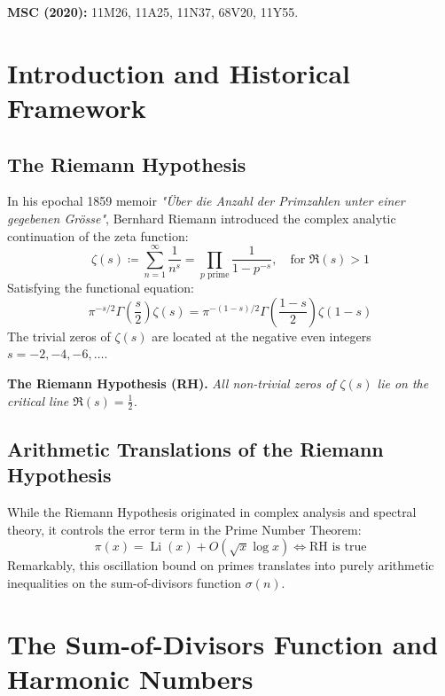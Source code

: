 \documentclass[11pt,a4paper]{article}
\theoremstyle{definition}
\begin{document}
\noindent\textbf{MSC (2020):} 11M26, 11A25, 11N37, 68V20, 11Y55.

\tableofcontents
\newpage

\section{Introduction and Historical Framework}

\subsection{The Riemann Hypothesis}
In his epochal 1859 memoir \emph{"Über die Anzahl der Primzahlen unter einer gegebenen Grösse"}, Bernhard Riemann \cite{riemann1859} introduced the complex analytic continuation of the zeta function:
\begin{equation}\label{eq:zeta_def}
\zeta(s) \coloneqq \sum_{n=1}^\infty \frac{1}{n^s} = \prod_{p \text{ prime}} \frac{1}{1 - p^{-s}}, \quad \text{for } \Re(s) > 1
\end{equation}
Satisfying the functional equation:
\begin{equation}\label{eq:functional}
\pi^{-s/2} \Gamma\left(\frac{s}{2}\right) \zeta(s) = \pi^{-(1-s)/2} \Gamma\left(\frac{1-s}{2}\right) \zeta(1-s)
\end{equation}
The trivial zeros of $\zeta(s)$ are located at the negative even integers $s = -2, -4, -6, \dots$.

\noindent\textbf{The Riemann Hypothesis (RH).} \textit{All non-trivial zeros of $\zeta(s)$ lie on the critical line $\Re(s) = \frac{1}{2}$.}

\subsection{Arithmetic Translations of the Riemann Hypothesis}
While the Riemann Hypothesis originated in complex analysis and spectral theory, it controls the error term in the Prime Number Theorem:
\begin{equation}\label{eq:pnt_error}
\pi(x) = \operatorname{Li}(x) + O\left(\sqrt{x} \log x\right) \iff \text{RH is true}
\end{equation}
Remarkably, this oscillation bound on primes translates into purely arithmetic inequalities on the sum-of-divisors function $\sigma(n)$.

\section{The Sum-of-Divisors Function and Harmonic Numbers}
\end{document}
